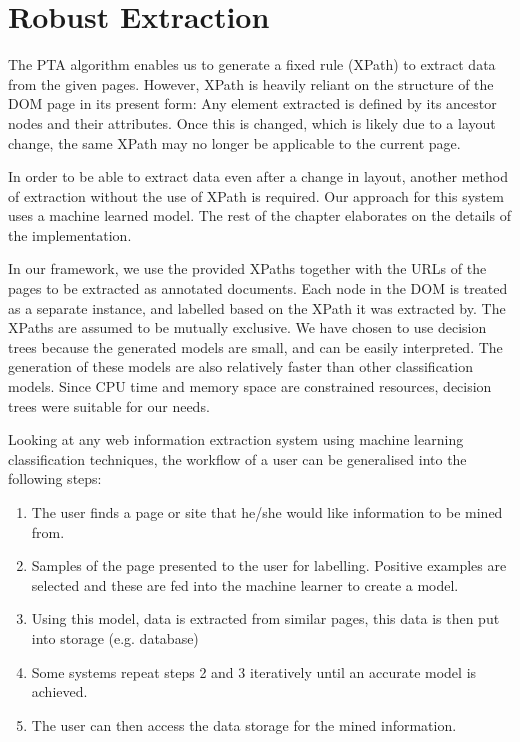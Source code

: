 \section{Robust Extraction}
\label{section:extraction}
The PTA algorithm enables us to generate a fixed rule (XPath) to extract data from the given pages.
However, XPath is heavily reliant on the structure of the DOM page in its present form: Any element
extracted is defined by its ancestor nodes and their attributes. Once this is changed, which is
likely due to a layout change, the same XPath may no longer be applicable to the current page. 

In order to be able to extract data even after a change in layout, another method of extraction
without the use of XPath is required. Our approach for this system uses a machine learned model.
The rest of the chapter elaborates on the details of the implementation.

In our framework, we use the provided XPaths together with the URLs of the pages to be extracted
as annotated documents. Each node in the DOM is treated as a separate instance, and labelled
based on the XPath it was extracted by. The XPaths are assumed to be mutually exclusive. We have
chosen to use decision trees because the generated models are small, and can be easily interpreted.
The generation of these models are also relatively faster than other classification models. Since
CPU time and memory space are constrained resources, decision trees were suitable for our needs.

	
Looking at any web information extraction system using machine learning classification techniques, the workflow of a user can be generalised into the following steps:
\begin{enumerate}
	\item The user finds a page or site that he/she would like information to be mined from.
	\item Samples of the page presented to the user for labelling. Positive examples are selected and these are fed into the machine learner to create a model.
	\item Using this model, data is extracted from similar pages, this data is then put into storage (e.g. database)
	\item Some systems repeat steps 2 and 3 iteratively until an accurate model is achieved.
	\item The user can then access the data storage for the mined information.
\end{enumerate}

